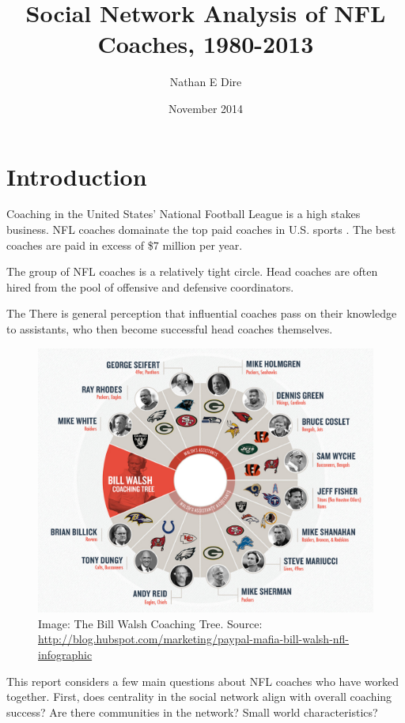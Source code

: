 \documentclass{article}\usepackage[]{graphicx}\usepackage[]{color}
\begin{document}
\title{Social Network Analysis of NFL Coaches, 1980-2013}
\author{Nathan E Dire}
\date{November 2014}
\maketitle

\section{Introduction}

Coaching in the United States' National Football League is a high stakes
business.  NFL coaches domainate the top paid coaches in U.S. sports
\cite{forbes-pay}.  The best coaches are paid in excess of \$7 million per year.

The group of NFL coaches is a relatively tight circle.  Head coaches are often
hired from the pool of offensive and defensive coordinators.  

The There is general perception that influential coaches pass on their knowledge to
assistants, who then become successful head coaches themselves.
\begin{figure}
\begin{center}
\includegraphics[width=\textwidth]{walsh_network.png}
\end{center}
\caption{Image: The Bill Walsh Coaching Tree. Source:
\url{http://blog.hubspot.com/marketing/paypal-mafia-bill-walsh-nfl-infographic}}
\label{fig-bill-walsh}
\end{figure}

This report considers a few main questions about NFL coaches who have worked
together.  First, does centrality in the social network align with overall
coaching success?  Are there communities in the network?  Small world
characteristics?
\end{document}
